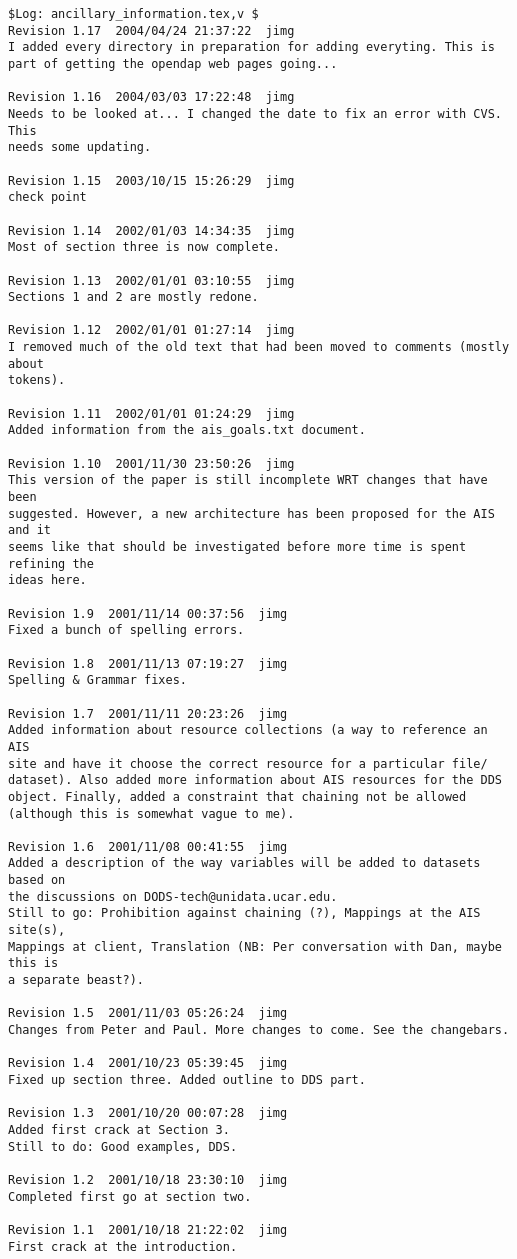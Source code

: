 \documentclass{article}
\begin{document}
\begin{verbatim}
$Log: ancillary_information.tex,v $
Revision 1.17  2004/04/24 21:37:22  jimg
I added every directory in preparation for adding everyting. This is
part of getting the opendap web pages going...

Revision 1.16  2004/03/03 17:22:48  jimg
Needs to be looked at... I changed the date to fix an error with CVS. This
needs some updating.

Revision 1.15  2003/10/15 15:26:29  jimg
check point

Revision 1.14  2002/01/03 14:34:35  jimg
Most of section three is now complete.

Revision 1.13  2002/01/01 03:10:55  jimg
Sections 1 and 2 are mostly redone.

Revision 1.12  2002/01/01 01:27:14  jimg
I removed much of the old text that had been moved to comments (mostly about
tokens).

Revision 1.11  2002/01/01 01:24:29  jimg
Added information from the ais_goals.txt document.

Revision 1.10  2001/11/30 23:50:26  jimg
This version of the paper is still incomplete WRT changes that have been
suggested. However, a new architecture has been proposed for the AIS and it
seems like that should be investigated before more time is spent refining the
ideas here.

Revision 1.9  2001/11/14 00:37:56  jimg
Fixed a bunch of spelling errors.

Revision 1.8  2001/11/13 07:19:27  jimg
Spelling & Grammar fixes.

Revision 1.7  2001/11/11 20:23:26  jimg
Added information about resource collections (a way to reference an AIS
site and have it choose the correct resource for a particular file/
dataset). Also added more information about AIS resources for the DDS
object. Finally, added a constraint that chaining not be allowed
(although this is somewhat vague to me).

Revision 1.6  2001/11/08 00:41:55  jimg
Added a description of the way variables will be added to datasets based on
the discussions on DODS-tech@unidata.ucar.edu.
Still to go: Prohibition against chaining (?), Mappings at the AIS site(s),
Mappings at client, Translation (NB: Per conversation with Dan, maybe this is
a separate beast?).

Revision 1.5  2001/11/03 05:26:24  jimg
Changes from Peter and Paul. More changes to come. See the changebars.

Revision 1.4  2001/10/23 05:39:45  jimg
Fixed up section three. Added outline to DDS part.

Revision 1.3  2001/10/20 00:07:28  jimg
Added first crack at Section 3.
Still to do: Good examples, DDS.

Revision 1.2  2001/10/18 23:30:10  jimg
Completed first go at section two.

Revision 1.1  2001/10/18 21:22:02  jimg
First crack at the introduction.

\end{verbatim}
\end{document}
